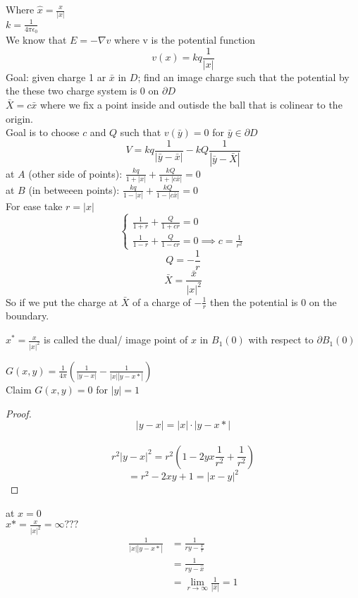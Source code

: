 \documentclass[answers,12pt,addpoints]{exam}
\begin{document}
Where $\hat{x} = \frac{x}{|x|}$\\
$k = \frac{1}{4\pi \epsilon_0}$\\
We know that $E = -\nabla v$ where v is the potential function\\
$$v(x) = kq \frac{1}{|x|}$$
Goal: given charge 1 ar $\bar{x}$ in $D$; find an image charge such that the potential by the these two charge system is 0 on $\partial D$\\
$\bar{X} = c\bar{x}$ where we fix a point inside and outisde the ball that is colinear to the origin. \\
Goal is to choose $c$ and $Q$ such that $v(\bar{y}) = 0$ for $\bar{y} \in \partial D$\\
$$V = k q\frac{1}{|\bar{y} - \bar{x}|} - kQ \frac{1}{|\bar{y} - \bar{X}|}$$
at $A$ (other side of points): $\frac{kq}{1+|x|} + \frac{kQ}{1+|c\bar{x}|} = 0$\\
at $B$ (in betweeen points): $\frac{kq}{1-|x|} + \frac{kQ}{1-|c\bar{x}|} = 0$\\
For ease take $r = |x|$
$$\begin{cases}
    \frac{1}{1+r} + \frac{Q}{1+cr} = 0\\
    \frac{1}{1-r} + \frac{Q}{1-cr} = 0
    \implies c = \frac{1}{r^2}
\end{cases}$$
$$Q = -\frac{1}{r}$$
$$ \bar{X} = \frac{\bar{x}}{|x|^2}$$
So if we put the charge at $\bar{X}$ of a charge of $-\frac{1}{r}$ then the potential is 0 on the boundary.\\
\begin{definition}
    $x^* = \frac{x}{|x|^2}$ is called the dual/ image point of $x$ in $B_1(0)$ with respect to $\partial B_1(0)$
\end{definition}
$G(x,y) = \frac{1}{4\pi} \left(\frac{1}{|y-x|} - \frac{1}{|x||y-x*|}\right)$\\
Claim $G(x,y) = 0$ for $|y| = 1$\\
\begin{proof}
    $$|y-x| = |x| \cdot |y-x*|$$\\
    $$ r^2 |y-x|^2 = r^2 (1-2yx \frac{1}{r^2} + \frac{1}{r^2})$$
    $$ = r^2 - 2xy +1 = |x-y|^2$$
\end{proof}
at $x = 0$\\
$x* = \frac{x}{|x|^2} = \infty???$\\
\begin{align*}
    \frac{1}{|x||y-x*|} &= \frac{1}{ry - \frac{x}{r}}\\
    &= \frac{1}{ry - \hat{x}}\\
    &= \lim_{r \to \infty} \frac{1}{|\hat{x}|} = 1
\end{align*}
\end{document}
